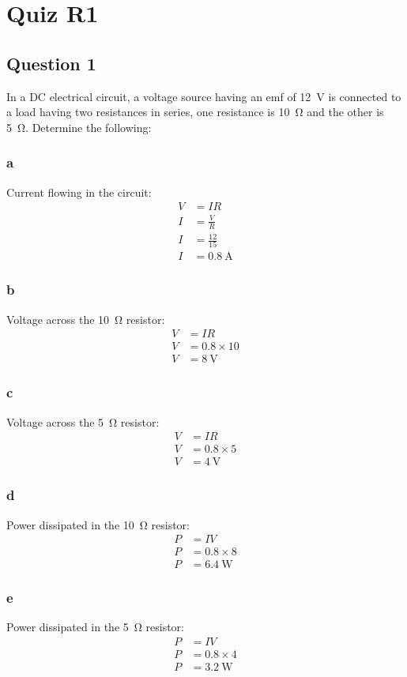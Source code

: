 \chapter{Quiz R1}
\section{Question 1}
In a DC electrical circuit, a voltage source having an emf of \SI{12}{\volt} is connected to a load having two resistances in series, one resistance is \SI{10}{\ohm} and the other is \SI{5}{\ohm}. Determine the following:
\subsection{a}
Current flowing in the circuit:
\begin{align}
    V &= IR\\
    I &= \frac{V}{R}\\
    I &= \frac{12}{15}\\
    I &= \SI{0.8}{\ampere}
\end{align}
\subsection{b}
Voltage across the \SI{10}{\ohm} resistor:
\begin{align}
    V &= IR\\
    V &= 0.8\times 10\\
    V &= \SI{8}{\volt}
\end{align}
\subsection{c}
Voltage across the \SI{5}{\ohm} resistor:
\begin{align}
    V &= IR\\
    V &= 0.8\times 5\\
    V &= \SI{4}{\volt}
\end{align}
\subsection{d}
Power dissipated in the \SI{10}{\ohm} resistor:
\begin{align}
    P &= IV\\
    P &= 0.8\times 8\\
    P &= \SI{6.4}{\watt}
\end{align}
\subsection{e}
Power dissipated in the \SI{5}{\ohm} resistor:
\begin{align}
    P &= IV\\
    P &= 0.8\times 4\\
    P &= \SI{3.2}{\watt}
\end{align}
